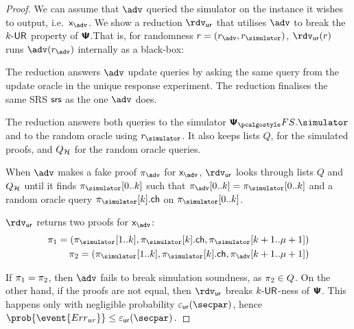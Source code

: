 \begin{proof}
  We can assume that $\adv$ queried the simulator on the instance it wishes to
  output, i.e.~$\inp_{\adv}$. We show a reduction $\rdvur$ that utilises $\adv$ to
  break the ${k\text{-}\mathsf{UR}}$ property of $\bm{\mathsf{\Psi}}$.That is, for randomness $r = (r_\adv, \rsim)$,
  $\rdvur (r)$ runs $\advse(r_\adv)$ internally as a black-box:
  \begin{compactitem}
  \item The reduction answers $\adv$ update queries by asking the same query from the
    update oracle in the unique response experiment. The reduction finalises the same
    SRS $\mathsf{srs}$ as the one $\adv$ does.
  \item The reduction answers both queries to the simulator $\psfs.\simulator$
      and to the random oracle using $\rsim$. It also keeps lists $Q$, for the simulated proofs,
      and $Q_{\mathcal{H}}$ for the random oracle queries.
  \item When $\adv$ makes a fake proof $\zkproof_{\adv}$ for $\inp_{\adv}$, $\rdvur$
    looks through lists $Q$ and $Q_{\mathcal{H}}$ until it finds $\zkproof_{\simulator}[0..k]$
    such that $\zkproof_{\adv}[0..k] = \zkproof_{\simulator}[0..k]$ and a random
    oracle query $\zkproof_{\simulator}[k].\ch$ on $\zkproof_{\simulator}[0..k]$.
  \item $\rdvur$ returns two proofs for $\inp_{\adv}$:
  	\begin{align*}
      \zkproof_1 = (\zkproof_{\simulator}[1..k],
      \zkproof_{\simulator}[k].\ch, \zkproof_{\simulator}[k + 1..\mu + 1])\\
      \zkproof_2 = (\zkproof_{\simulator}[1..k],
      \zkproof_{\simulator}[k].\ch, \zkproof_{\adv}[k + 1..\mu + 1])
  	\end{align*}
  \end{compactitem}
  If $\pi_1 = \pi_2$, then $\adv$ fails to break simulation soundness, as
  $\pi_2 \in Q$. On the other hand, if the proofs are not equal, then $\rdvur$
  breaks ${k\text{-}\mathsf{UR}}$-ness of $\bm{\mathsf{\Psi}}$. This happens only with negligible probability
  $\epsur(\secpar)$, hence \( \prob{\event{\errur}} \leq \epsur(\secpar)\,. \)

\end{proof}
